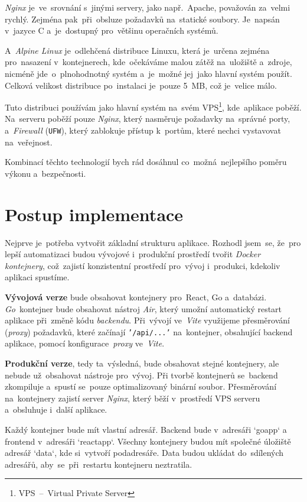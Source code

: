 \documentclass[10pt,a4paper]{article}
\begin{document}
            \emph{Nginx} je~ve~srovnání s~jinými servery, jako např.~Apache, považován za~velmi rychlý. Zejména pak~při~obsluze požadavků na~statické soubory. Je~napsán v~jazyce C a~je~dostupný pro~většinu operačních systémů. \cite{WhatNGINX}

            A~\emph{Alpine Linux} je~odlehčená distribuce Linuxu, která je~určena zejména pro~nasazení v~kontejnerech, kde~očekáváme malou zátěž na~uložiště a~zdroje, nicméně jde~o~plnohodnotný systém a~je~možné jej~jako hlavní systém použít. Celková velikost distribuce po~instalaci je~pouze 5~MB, což je~velice málo.

            Tuto distribuci používám jako hlavní systém na~svém VPS\footnote{VPS~--~Virtual Private Server}, kde~aplikace poběží. Na~serveru poběží pouze \emph{Nginx}, který nasměruje požadavky na~správné porty, a~\emph{Firewall} (\texttt{UFW}), který zablokuje přístup k~portům, které nechci vystavovat na~veřejnost.

            Kombinací těchto technologií bych rád dosáhnul co~možná~nejlepšího poměru výkonu a~bezpečnosti.
	
	\section{Postup implementace}
        Nejprve je~potřeba vytvořit základní strukturu aplikace. Rozhodl jsem~se, že~pro lepší automatizaci budou vývojové i~produkční prostředí tvořit \emph{Docker kontejnery}, což~zajistí konzistentní prostředí pro~vývoj i~produkci, kdekoliv aplikaci spustíme.
        
        \textbf{Vývojová verze} bude obsahovat kontejnery pro~React, Go a~databázi. \emph{Go}~kontejner bude obsahovat nástroj \emph{Air}, který umožní automatický restart aplikace při~změně kódu \emph{backendu}. Při~vývojí ve~\emph{Vite} využijeme přesměrování (\emph{proxy}) požadavků, které začínají \texttt{'/api/...'} na~kontejner, obsahující backend aplikace, pomocí konfigurace~\emph{proxy} ve~\emph{Vite}.

        \textbf{Produkční verze}, tedy ta~výsledná, bude obsahovat stejné kontejnery, ale nebude už~obsahovat nástroje pro~vývoj. Při tvorbě kontejnerů se~backend zkompiluje a~spustí se~pouze optimalizovaný binární soubor.
        Přesměrování na~kontejnery zajistí server \emph{Nginx}, který běží v~prostředí VPS serveru a~obsluhuje i~další aplikace.

        Každý kontejner bude mít vlastní adresář. Backend bude v~adresáři `goapp` a frontend v~adresáři `reactapp`. Všechny kontejnery budou mít společné úložiště adresář `data`, kde si~vytvoří podadresáře. Data budou ukládat do~sdílených adresářů, aby~se~při~restartu kontejneru neztratila.
\end{document}
